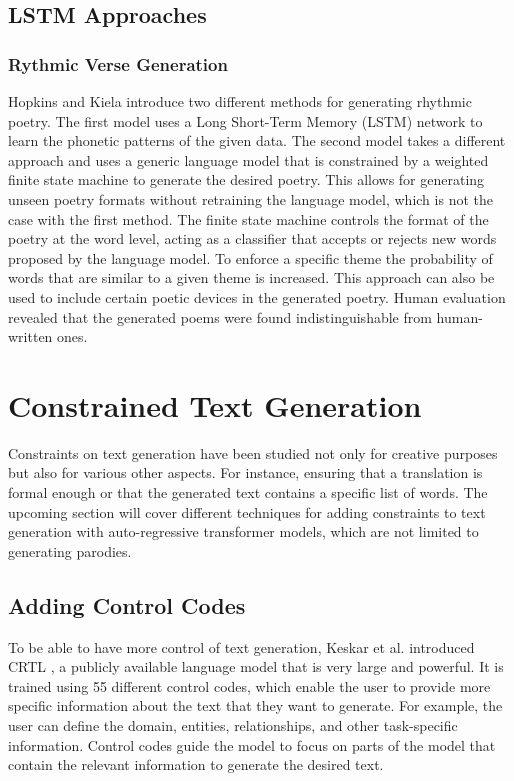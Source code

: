 \subsection{LSTM Approaches}
\subsubsection{Rythmic Verse Generation}
Hopkins and Kiela \cite{hopkins-kiela-2017-automatically} introduce two different methods for generating rhythmic poetry. The first model uses a Long Short-Term Memory (LSTM) network to learn the phonetic patterns of the given data. The second model takes a different approach and uses a generic language model that is constrained by a weighted finite state machine to generate the desired poetry. This allows for generating unseen poetry formats without retraining the language model, which is not the case with the first method. The finite state machine controls the format of the poetry at the word level, acting as a classifier that accepts or rejects new words proposed by the language model. To enforce a specific theme the probability of words that are similar to a given theme is increased. This approach can also be used to include certain poetic devices in the generated poetry. Human evaluation revealed that the generated poems were found indistinguishable from human-written ones. 


\section{Constrained Text Generation}
Constraints on text generation have been studied not only for creative purposes but also for various other aspects. For instance, ensuring that a translation is formal enough or that the generated text contains a specific list of words. \cite{meng_controllable_2022} The upcoming section will cover different techniques for adding constraints to text generation with auto-regressive transformer models, which are not limited to generating parodies. 



\subsection{Adding Control Codes}
To be able to have more control of text generation, Keskar et al. introduced CRTL \cite{keskar_ctrl_2019}, a publicly available language model that is very large and powerful.  It is trained using 55 different control codes, which enable the user to provide more specific information about the text that they want to generate. For example, the user can define the domain, entities, relationships, and other task-specific information. Control codes guide the model to focus on parts of the model that contain the relevant information to generate the desired text.

